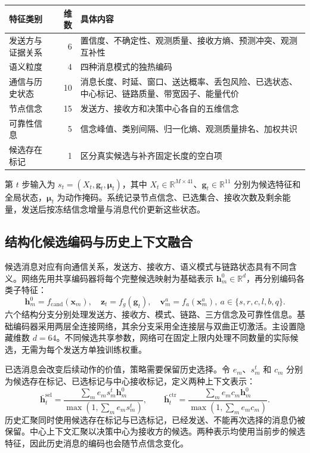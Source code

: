 \begin{table}[htbp]
\centering
{}
\label{rq2:tab:features}
\begin{tabularx}{\textwidth}{l r X}
\toprule
特征类别 & 维数 & 具体内容\\
\midrule
发送方与证据关系 & 6 & 置信度、不确定性、观测质量、接收方熵、预测冲突、观测互补性\\
语义粒度 & 4 & 四种消息模式的独热编码\\
通信与历史状态 & 10 & 消息长度、时延、窗口、送达概率、丢包风险、已选状态、中心标记、链路质量、带宽因子、能量代价\\
节点信念 & 15 & 发送方、接收方和决策中心各自的五维信念\\
可靠性信息 & 5 & 信念峰值、类别间隔、归一化熵、观测质量排名、加权共识\\
候选存在标记 & 1 & 区分真实候选与补齐固定长度的空白项\\
\bottomrule
\end{tabularx}
\end{table}

第 $t$ 步输入为 $s_t=(X_t,\bm g_t,\bm\mu_t)$，其中 $X_t\in\mathbb R^{M\times41}$、$\bm g_t\in\mathbb R^{11}$ 分别为候选特征和全局状态，$\bm\mu_t$ 为动作掩码。系统记录节点信念、已选集合、接收次数及剩余能量，发送后按冻结信念增量与消息代价更新这些状态。

\FloatBarrier
\subsection{结构化候选编码与历史上下文融合}
候选消息对应有向通信关系，发送方、接收方、语义模式与链路状态具有不同含义。网络先用共享编码器将每个完整候选映射为基础表示 $\bm h_m^0\in\mathbb R^d$，再分别编码各类子特征：
\begin{equation}
\bm h_m^0=f_{\mathrm{cand}}(\bm x_m),\quad
\bm z_t=f_g(\bm g_t),\quad
\bm v_m^{a}=f_a(\bm x_m^{a}),\ a\in\{s,r,c,l,b,q\}.
\label{rq2:eq:encoders}
\end{equation}
六个结构分支分别处理发送方、接收方、模式、链路、三方信念及可靠性信息。基础编码器采用两层全连接网络，其余分支采用全连接层与双曲正切激活。主设置隐藏维数 $d=64$。不同候选共享参数，网络可在固定上限内处理不同数量的实际候选，无需为每个发送方单独训练权重。

已选消息会改变后续动作的价值，策略需要保留历史选择。令 $e_m$、$s_m^t$ 和 $c_m$ 分别为候选存在标记、已选标记与中心接收标记，定义两种上下文表示：
\begin{equation}
\bar{\bm h}_t^{\mathrm{sel}}=
\frac{\sum_m e_ms_m^t\bm h_m^0}{\max(1,\sum_m e_ms_m^t)},\qquad
\bar{\bm h}_t^{\mathrm{ctr}}=
\frac{\sum_m e_mc_m\bm h_m^0}{\max(1,\sum_m e_mc_m)}.
\label{rq2:eq:history}
\end{equation}
历史汇聚同时使用候选存在标记与已选标记，已经发送、不能再次选择的消息仍被保留。中心上下文汇聚以决策中心为接收方的候选。两种表示均使用当前步的候选特征，因此历史消息的编码也会随节点信念变化。

